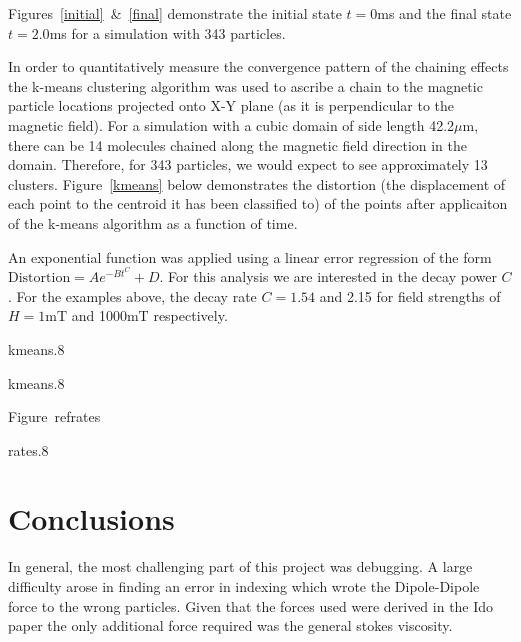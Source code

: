 Figures~\ref{initial}~\&~\ref{final} demonstrate the initial state
$t=0$ms and the final state $t=2.0$ms for a simulation with 343
particles.

\begin{multicols}{2}

  \end{multicols}

In order to quantitatively measure the convergence pattern of the
chaining effects the k-means clustering algorithm\cite{4} was used to
ascribe a chain to the magnetic particle locations projected onto X-Y
plane (as it is perpendicular to the magnetic field). For a simulation
with a cubic domain of side length 42.2$\mu$m, there can be 14
molecules chained along the magnetic field direction in the domain.
Therefore, for 343 particles, we would expect to see approximately 13
clusters. Figure~\ref{kmeans} below demonstrates the distortion (the
displacement of each point to the centroid it has been classified to)
of the points after applicaiton of the k-means algorithm as a function
of time.


An exponential function was applied using a linear error regression of
the form $\text{Distortion} = A e^{-Bt^C} + D$.  For this analysis we
are interested in the decay power $C$. For the examples above, the
decay rate $C = 1.54$ and 2.15 for field strengths of $ H = 1$mT and
1000mT respectively.

 {kmeans}{.8}

 {kmeans}{.8}

Figure~ref{rates}

 {rates}{.8}

\section*{Conclusions}

In general, the most challenging part of this project was debugging. A
large difficulty arose in finding an error in indexing which wrote the
Dipole-Dipole force to the wrong particles.  Given that the forces
used were derived in the Ido paper\cite{1} the only additional force
required was the general stokes viscosity.


